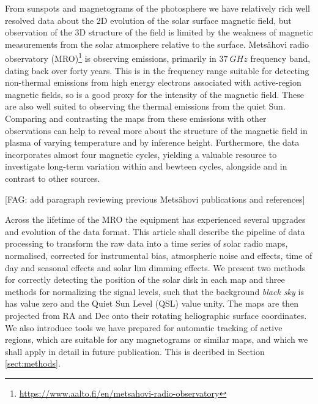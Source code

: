 \documentclass{aa}
\newcommand{\fag}[1]{\textcolor{midpurple}{[FAG: #1]}} %
\begin{document}
  From sunspots and magnetograms of the photosphere we have relatively rich
  well resolved data about the 2D evolution of the solar surface magnetic 
  field, but observation of the 3D structure of the field is limited by the 
  weakness of magnetic measurements from the solar atmosphere relative to the
  surface.
  Mets\"ahovi radio observatory (MRO)\footnote{
  \href{https://www.aalto.fi/en/metsahovi-radio-observatory}{
        https://www.aalto.fi/en/metsahovi-radio-observatory}}
  is observing emissions, primarily in
  $\SI{37}{GHz}$ frequency band, dating back over forty years.
  This is in the frequency range suitable for detecting non-thermal emissions
  from high energy electrons associated with active-region magnetic fields, so
  is a good proxy for the intensity of the magnetic field.
  These are also well suited to observing the thermal emissions from the quiet
  Sun.
  Comparing and contrasting the maps from these emissions with other
  observations can help to reveal more about the structure of the magnetic
  field in plasma of varying temperature and by inference height.
  Furthermore, the data incorporates almost four magnetic cycles, yielding
  a valuable resource to investigate long-term variation within and bewteen 
  cycles, alongside and in contrast to other sources.

  \fag{add paragraph reviewing previous Mets\"ahovi publications and references}

  Across the lifetime of the MRO the equipment has experienced several upgrades
  and evolution of the data format.
  This article shall describe the pipeline of data processing to transform the
  raw data into a time series of solar radio maps, normalised, corrected for
  instrumental bias, atmospheric noise and effects, time of day and seasonal
  effects and solar lim dimming effects.
  We present two methods for correctly detecting the position of the solar disk
  in each map and three methods for normalizing the signal levels, such that
  the background \emph{black sky} is has value zero and the 
  Quiet Sun Level (QSL) value unity.
  The maps are then projected from RA and Dec onto their rotating heliographic
  surface coordinates.
  We also introduce tools we have prepared for automatic tracking of active 
  regions, which are suitable for any magnetograms or similar maps, and which
  we shall apply in detail in future publication.
  This is decribed in Section\,\ref{sect:methods}.
\end{document}

